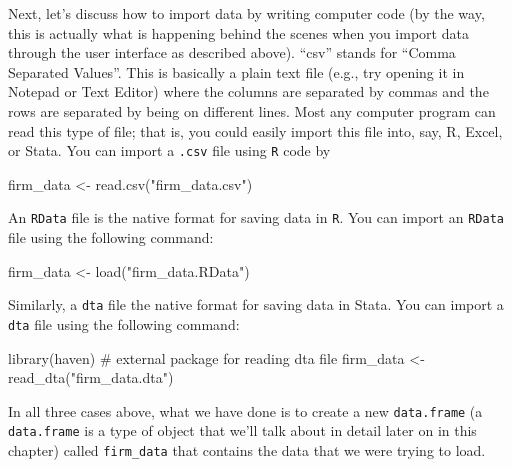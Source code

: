 \documentclass[
  letterpaper,
  DIV=11,
  numbers=noendperiod]{scrreprt}
\newenvironment{Shaded}{\begin{snugshade}}{\end{snugshade}}
\newcommand{\CommentTok}[1]{\textcolor[rgb]{0.37,0.37,0.37}{#1}}
\newcommand{\FunctionTok}[1]{\textcolor[rgb]{0.28,0.35,0.67}{#1}}
\newcommand{\NormalTok}[1]{\textcolor[rgb]{0.00,0.23,0.31}{#1}}
\newcommand{\OtherTok}[1]{\textcolor[rgb]{0.00,0.23,0.31}{#1}}
\newcommand{\StringTok}[1]{\textcolor[rgb]{0.13,0.47,0.30}{#1}}
\begin{document}
Next, let's discuss how to import data by writing computer code (by the
way, this is actually what is happening behind the scenes when you
import data through the user interface as described above). ``csv''
stands for ``Comma Separated Values''. This is basically a plain text
file (e.g., try opening it in Notepad or Text Editor) where the columns
are separated by commas and the rows are separated by being on different
lines. Most any computer program can read this type of file; that is,
you could easily import this file into, say, R, Excel, or Stata. You can
import a \texttt{.csv} file using \texttt{R} code by

\begin{Shaded}
\begin{Highlighting}[]
\NormalTok{firm\_data }\OtherTok{\textless{}{-}} \FunctionTok{read.csv}\NormalTok{(}\StringTok{"firm\_data.csv"}\NormalTok{)}
\end{Highlighting}
\end{Shaded}

An \texttt{RData} file is the native format for saving data in
\texttt{R}. You can import an \texttt{RData} file using the following
command:

\begin{Shaded}
\begin{Highlighting}[]
\NormalTok{firm\_data }\OtherTok{\textless{}{-}} \FunctionTok{load}\NormalTok{(}\StringTok{"firm\_data.RData"}\NormalTok{)}
\end{Highlighting}
\end{Shaded}

Similarly, a \texttt{dta} file the native format for saving data in
Stata. You can import a \texttt{dta} file using the following command:

\begin{Shaded}
\begin{Highlighting}[]
\FunctionTok{library}\NormalTok{(haven) }\CommentTok{\# external package for reading dta file}
\NormalTok{firm\_data }\OtherTok{\textless{}{-}} \FunctionTok{read\_dta}\NormalTok{(}\StringTok{"firm\_data.dta"}\NormalTok{)}
\end{Highlighting}
\end{Shaded}

In all three cases above, what we have done is to create a new
\texttt{data.frame} (a \texttt{data.frame} is a type of object that
we'll talk about in detail later on in this chapter) called
\texttt{firm\_data} that contains the data that we were trying to load.
\end{document}
